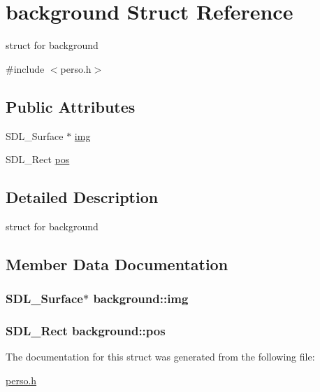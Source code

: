 \hypertarget{structbackground}{}\section{background Struct Reference}
\label{structbackground}


struct for background  




{\ttfamily \#include $<$perso.\+h$>$}

\subsection*{Public Attributes}
\begin{DoxyCompactItemize}
\item 
S\+D\+L\+\_\+\+Surface $\ast$ \hyperlink{structbackground_a1c5c3a3ebb56924b9f829602f9641006}{img}
\item 
S\+D\+L\+\_\+\+Rect \hyperlink{structbackground_aa70f1467505f43c50fec228c21bd7af4}{pos}
\end{DoxyCompactItemize}


\subsection{Detailed Description}
struct for background 

\subsection{Member Data Documentation}
\subsubsection[{\texorpdfstring{img}{img}}]{\setlength{\rightskip}{0pt plus 5cm}S\+D\+L\+\_\+\+Surface$\ast$ background\+::img}\hypertarget{structbackground_a1c5c3a3ebb56924b9f829602f9641006}{}\label{structbackground_a1c5c3a3ebb56924b9f829602f9641006}
\subsubsection[{\texorpdfstring{pos}{pos}}]{\setlength{\rightskip}{0pt plus 5cm}S\+D\+L\+\_\+\+Rect background\+::pos}\hypertarget{structbackground_aa70f1467505f43c50fec228c21bd7af4}{}\label{structbackground_aa70f1467505f43c50fec228c21bd7af4}


The documentation for this struct was generated from the following file\+:\begin{DoxyCompactItemize}
\item 
\hyperlink{perso_8h}{perso.\+h}\end{DoxyCompactItemize}
